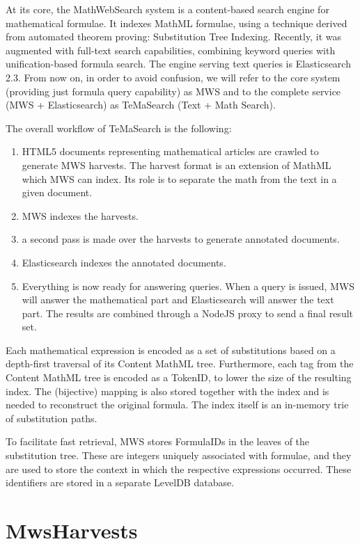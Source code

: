 \documentclass{deliverablereport}
\begin{document}
At its core, the MathWebSearch system is a content-based search engine for mathematical
formulae. It indexes MathML formulae, using a technique derived from automated theorem
proving: Substitution Tree Indexing. Recently, it was augmented with full-text search
capabilities, combining keyword queries with unification-based formula search. The engine
serving text queries is Elasticsearch 2.3. From now on, in order to avoid confusion, we
will refer to the core system (providing just formula query capability) as MWS and to the
complete service (MWS + Elasticsearch) as TeMaSearch (Text + Math Search).

The overall workflow of TeMaSearch is the following: 

\begin{enumerate}
\item HTML5 documents representing mathematical articles are crawled to generate MWS
  harvests. The harvest format is an extension of MathML which MWS can index. Its role is
  to separate the math from the text in a given document.
\item MWS indexes the harvests.
\item a second pass is made over the harvests to generate annotated documents.
\item Elasticsearch indexes the annotated documents.
\item Everything is now ready for answering queries. When a query is issued, MWS will
  answer the mathematical part and Elasticsearch will answer the text part. The results
  are combined through a NodeJS proxy to send a final result set.
\end{enumerate}

Each mathematical expression is encoded as a set of substitutions based on a depth-first
traversal of its Content MathML tree. Furthermore, each tag from the Content MathML tree
is encoded as a TokenID, to lower the size of the resulting index. The (bijective) mapping
is also stored together with the index and is needed to reconstruct the original
formula. The index itself is an in-memory trie of substitution paths.

To facilitate fast retrieval, MWS stores FormulaIDs in the leaves of the substitution
tree. These are integers uniquely associated with formulae, and they are used to store the
context in which the respective expressions occurred. These identifiers are stored in a
separate LevelDB database.

\section{MwsHarvests}\label{sec:harvests}
\end{document}
